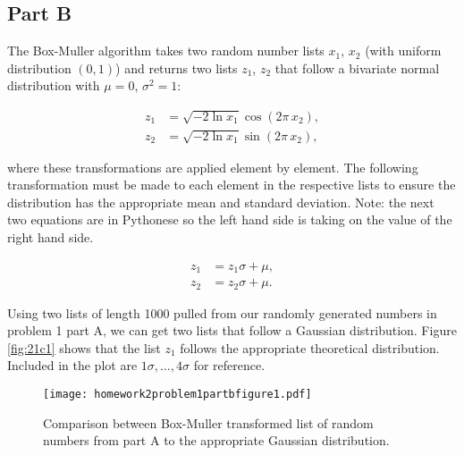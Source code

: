 \subsection{Part B}

The Box-Muller algorithm takes two random number lists $x_{1}$, $x_{2}$ (with uniform distribution $(0,1)$) and returns two lists $z_{1}$, $z_{2}$ that follow a bivariate normal distribution with $\mu = 0$, $\sigma^{2} = 1$:

\begin{align}
z_{1} &= \sqrt{-2 \ln x_{1}} \cos(2\pi \, x_{2}), \\
z_{2} &= \sqrt{-2 \ln x_{1}} \sin(2\pi \, x_{2}),
\end{align}


where these transformations are applied element by element. The following transformation must be made to each element in the respective lists to ensure the distribution has the appropriate mean and standard deviation. Note: the next two equations are in Pythonese so the left hand side is taking on the value of the right hand side.

\begin{align}
z_{1} &= z_{1}\sigma + \mu, \\
z_{2} &= z_{2}\sigma + \mu.
\end{align}

Using two lists of length 1000 pulled from our randomly generated numbers in problem 1 part A, we can get two lists that follow a Gaussian distribution. Figure \ref{fig:21c1} shows that the list $z_{1}$ follows the appropriate theoretical distribution. Included in the plot are $1\sigma, \dots, 4\sigma$ for reference.



\clearpage

\begin{figure}[h]
    \centering
    \texttt{[image: homework2problem1partbfigure1.pdf]}
    \caption{Comparison between Box-Muller transformed list of random numbers from part A to the appropriate Gaussian distribution.}
    \label{fig:21b1}
\end{figure}

\clearpage
